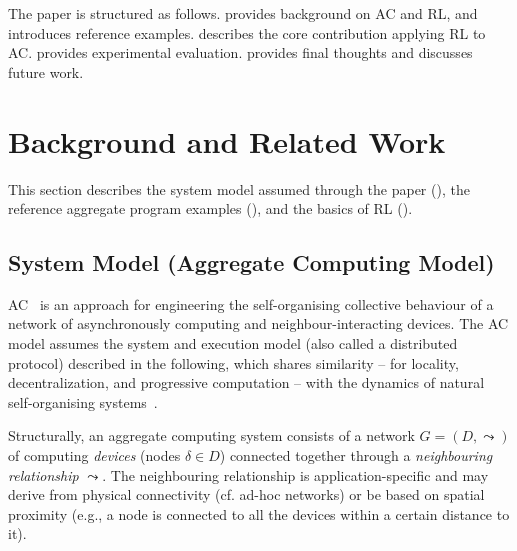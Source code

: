 The paper is structured as follows.
%
 provides background on \ac{AC} and \ac{RL}, and introduces reference examples. 
%
 describes the core contribution applying \ac{RL} to \ac{AC}. %
%
 provides experimental evaluation. %
%
 provides final thoughts and discusses future work.

\section{Background and Related Work}
\label{sec:background}

This section
 describes the system model
 assumed through the paper (),
 the reference aggregate program examples
 (),
 and the basics of \ac{RL}
 ().

\subsection{System Model (Aggregate Computing Model)}\label{s:background:ac}

\ac{AC}~\cite{DBLP:journals/computer/BealPV15,DBLP:journals/jlap/ViroliBDACP19}
 is an approach 
 for engineering the self-organising collective behaviour
 of a network of asynchronously computing and neighbour-interacting devices.
%
The \ac{AC} model 
 assumes the system and execution model (also called a distributed protocol) described in the following,
 which shares similarity -- for locality, decentralization, and progressive computation -- with the dynamics of natural self-organising systems~\cite{bonabeau1999swarm-intelligence}.
%

\newcommand{\neigh}{\ensuremath{\leadsto}}
\newcommand{\deviceId}{\ensuremath{\delta}}

Structurally, an aggregate computing system consists of a network $G=(D,\neigh)$ of computing \emph{devices} (nodes $\deviceId \in D$)
 connected together through a \emph{neighbouring relationship} $\neigh$.
%
The neighbouring relationship is application-specific
 and may derive 
 from physical connectivity (cf. ad-hoc networks)
 or 
 be based on spatial proximity (e.g., a node is connected to all the devices within a certain distance to it).

